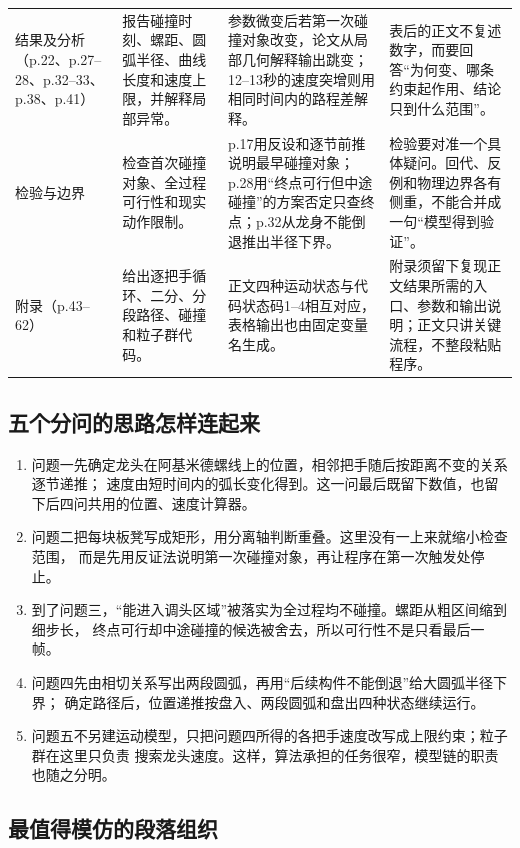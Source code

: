 \documentclass[UTF8,zihao=-4]{ctexart}
\begin{document}
\begin{longtable}{p{2.25cm}p{4.0cm}p{5.1cm}p{4.2cm}}
结果及分析（p.22、p.27--28、p.32--33、p.38、p.41）
& 报告碰撞时刻、螺距、圆弧半径、曲线长度和速度上限，并解释局部异常。
& 参数微变后若第一次碰撞对象改变，论文从局部几何解释输出跳变；12--13秒的速度突增则用相同时间内的路程差解释。
& 表后的正文不复述数字，而要回答“为何变、哪条约束起作用、结论只到什么范围”。\\

检验与边界
& 检查首次碰撞对象、全过程可行性和现实动作限制。
& p.17用反设和逐节前推说明最早碰撞对象；p.28用“终点可行但中途碰撞”的方案否定只查终点；p.32从龙身不能倒退推出半径下界。
& 检验要对准一个具体疑问。回代、反例和物理边界各有侧重，不能合并成一句“模型得到验证”。\\

附录（p.43--62）
& 给出逐把手循环、二分、分段路径、碰撞和粒子群代码。
& 正文四种运动状态与代码状态码1--4相互对应，表格输出也由固定变量名生成。
& 附录须留下复现正文结果所需的入口、参数和输出说明；正文只讲关键流程，不整段粘贴程序。\\
\end{longtable}
\normalsize

\subsection{五个分问的思路怎样连起来}

\begin{enumerate}
  \item 问题一先确定龙头在阿基米德螺线上的位置，相邻把手随后按距离不变的关系逐节递推；
  速度由短时间内的弧长变化得到。这一问最后既留下数值，也留下后四问共用的位置、速度计算器。
  \item 问题二把每块板凳写成矩形，用分离轴判断重叠。这里没有一上来就缩小检查范围，
  而是先用反证法说明第一次碰撞对象，再让程序在第一次触发处停止。
  \item 到了问题三，“能进入调头区域”被落实为全过程均不碰撞。螺距从粗区间缩到细步长，
  终点可行却中途碰撞的候选被舍去，所以可行性不是只看最后一帧。
  \item 问题四先由相切关系写出两段圆弧，再用“后续构件不能倒退”给大圆弧半径下界；
  确定路径后，位置递推按盘入、两段圆弧和盘出四种状态继续运行。
  \item 问题五不另建运动模型，只把问题四所得的各把手速度改写成上限约束；粒子群在这里只负责
  搜索龙头速度。这样，算法承担的任务很窄，模型链的职责也随之分明。
\end{enumerate}

\subsection{最值得模仿的段落组织}
\end{document}
